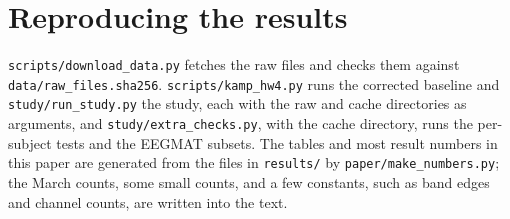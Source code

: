 \section*{Reproducing the results}

\texttt{scripts/download\_data.py} fetches the raw files and checks them against \texttt{data/raw\_files.sha256}. \texttt{scripts/kamp\_hw4.py} runs the corrected baseline and \texttt{study/run\_study.py} the study, each with the raw and cache directories as arguments, and \texttt{study/extra\_checks.py}, with the cache directory, runs the per-subject tests and the EEGMAT subsets. The tables and most result numbers in this paper are generated from the files in \texttt{results/} by \texttt{paper/make\_numbers.py}; the March counts, some small counts, and a few constants, such as band edges and channel counts, are written into the text.
